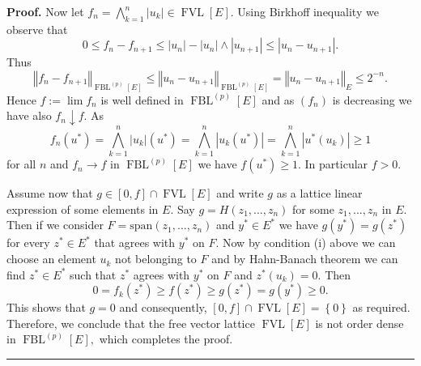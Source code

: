 \documentclass[10pt,a4paper]{amsart}
\newenvironment{proof}[1][Proof]{\noindent\textbf{#1.} }{\ \rule{0.5em}{0.5em}}
\begin{document}
\begin{proof}
Now let $f_{n}=\bigwedge\limits_{k=1}^{n}\left\vert u_{k}\right\vert
\in\operatorname*{FVL}\left[  E\right]  .$ Using Birkhoff inequality we
observe that%
\[
0\leq f_{n}-f_{n+1}\leq\left\vert u_{n}\right\vert -\left\vert u_{n}%
\right\vert \wedge\left\vert u_{n+1}\right\vert \leq\left\vert u_{n}%
-u_{n+1}\right\vert .
\]
Thus%
\[
\left\Vert f_{n}-f_{n+1}\right\Vert _{\operatorname*{FBL}\nolimits^{\left(
p\right)  }\left[  E\right]  }\leq\left\Vert u_{n}-u_{n+1}\right\Vert
_{\operatorname*{FBL}\nolimits^{\left(  p\right)  }\left[  E\right]
}=\left\Vert u_{n}-u_{n+1}\right\Vert _{E}\leq2^{-n}.
\]
Hence $f:=\lim f_{n}$ is well defined in $\operatorname*{FBL}%
\nolimits^{\left(  p\right)  }\left[  E\right]  $ and as $\left(
f_{n}\right)  $ is decreasing we have also $f_{n}\downarrow f.$ As%
\[
f_{n}\left(  u^{\ast}\right)  =\bigwedge\limits_{k=1}^{n}\left\vert
u_{k}\right\vert \left(  u^{\ast}\right)  =\bigwedge\limits_{k=1}%
^{n}\left\vert u_{k}\left(  u^{\ast}\right)  \right\vert =\bigwedge
\limits_{k=1}^{n}\left\vert u^{\ast}\left(  u_{k}\right)  \right\vert \geq1
\]
for all $n$ and $f_{n}\longrightarrow f$ in $\operatorname*{FBL}%
\nolimits^{(p)}\left[  E\right]  $ we have $f\left(  u^{\ast}\right)  \geq1.$
In particular $f>0.$

Assume now that $g\in\left[  0,f\right]  \cap\operatorname*{FVL}\left[
E\right]  $ and write $g$ as a lattice linear expression of some elements in
$E.$ Say $g=H\left(  z_{1},...,z_{n}\right)  $ for some $z_{1},...,z_{n}$ in
$E.$ Then if we consider $F=\mathrm{span}\left(  z_{1},...,z_{n}\right)  $ and
$y^{\ast}\in E^{\ast}$ we have $g\left(  y^{\ast}\right)  =g\left(  z^{\ast
}\right)  $ for every $z^{\ast}\in E^{\ast}$ that agrees with $y^{\ast}$ on
$F.$ Now by condition (i) above we can choose an element $u_{k}$ not belonging
to $F$ and by Hahn-Banach theorem we can find $z^{\ast}\in E^{\ast}$ such that
$z^{\ast}$ agrees with $y^{\ast}$ on $F$ and $z^{\ast}\left(  u_{k}\right)
=0.$ Then%
\[
0=f_{k}\left(  z^{\ast}\right)  \geq f\left(  z^{\ast}\right)  \geq g\left(
z^{\ast}\right)  =g\left(  y^{\ast}\right)  \geq0.
\]
This shows that $g=0$ and consequently, $\left[  0,f\right]  \cap
\operatorname*{FVL}\left[  E\right]  =\left\{  0\right\}  $ as required.
Therefore, we conclude that the free vector lattice $\operatorname*{FVL}%
\left[  E\right]  $ is not order dense in $\operatorname*{FBL}\nolimits^{(p)}%
\left[  E\right]  ,$ which completes the proof.
\end{proof}
\end{document}
